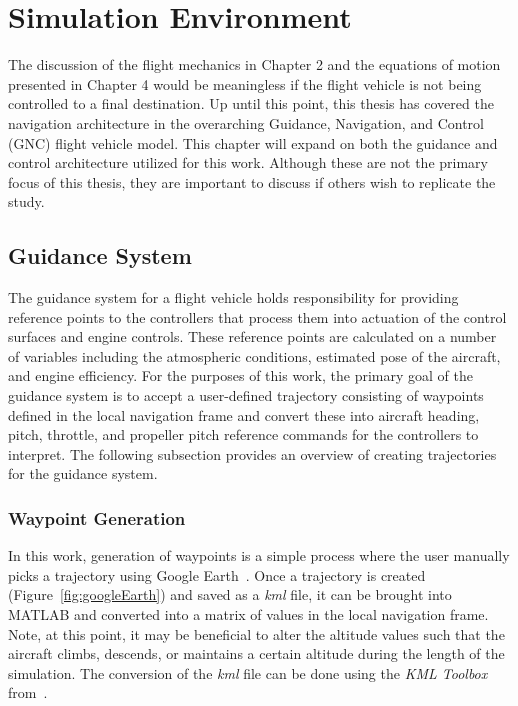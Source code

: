 \chapter{Simulation Environment}
The discussion of the flight mechanics in Chapter 2 and the equations of motion presented in Chapter 4 would be meaningless if the flight vehicle is not being controlled to a final destination. Up until this point, this thesis has covered the navigation architecture in the overarching Guidance, Navigation, and Control (GNC) flight vehicle model. This chapter will expand on both the guidance and control architecture utilized for this work. Although these are not the primary focus of this thesis, they are important to discuss if others wish to replicate the study.

\section{\textbf{Guidance System}}
The guidance system for a flight vehicle holds responsibility for providing reference points to the controllers that process them into actuation of the control surfaces and engine controls. These reference points are calculated on a number of variables including the atmospheric conditions, estimated pose of the aircraft, and engine efficiency. For the purposes of this work, the primary goal of the guidance system is to accept a user-defined trajectory consisting of waypoints defined in the local navigation frame and convert these into aircraft heading, pitch, throttle, and propeller pitch reference commands for the controllers to interpret. The following subsection provides an overview of creating trajectories for the guidance system.

\subsection{\textbf{Waypoint Generation}}
In this work, generation of waypoints is a simple process where the user manually picks a trajectory using Google Earth~\cite{GoogleEarth1969}. Once a trajectory is created (Figure~\ref{fig:googleEarth}) and saved as a \textit{kml} file, it can be brought into MATLAB and converted into a matrix of values in the local navigation frame. Note, at this point, it may be beneficial to alter the altitude values such that the aircraft climbs, descends, or maintains a certain altitude during the length of the simulation. The conversion of the \textit{kml} file can be done using the \textit{KML Toolbox} from~\cite{KMLToolboxFile1969}.

